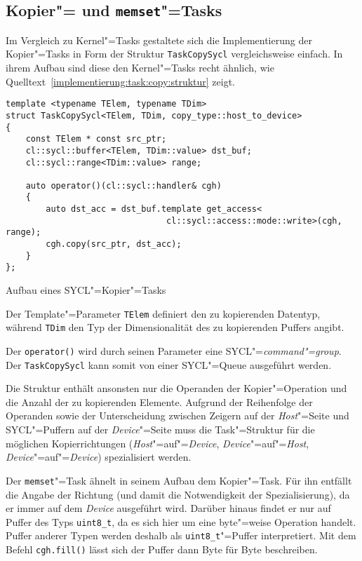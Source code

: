 \subsection{Kopier"= und \texttt{memset}"=Tasks}

Im Vergleich zu Kernel"=Tasks gestaltete sich die Implementierung der
Kopier"=Tasks in Form der Struktur \texttt{TaskCopySycl} vergleichsweise
einfach. In ihrem Aufbau sind diese den Kernel"=Tasks recht ähnlich, wie
Quelltext~\ref{implementierung:task:copy:struktur} zeigt.

\begin{code}
    \begin{verbatim}
template <typename TElem, typename TDim>
struct TaskCopySycl<TElem, TDim, copy_type::host_to_device>
{
    const TElem * const src_ptr;
    cl::sycl::buffer<TElem, TDim::value> dst_buf;
    cl::sycl::range<TDim::value> range;

    auto operator()(cl::sycl::handler& cgh)
    {
        auto dst_acc = dst_buf.template get_access<
                                cl::sycl::access::mode::write>(cgh, range);
        cgh.copy(src_ptr, dst_acc);
    }
};
    \end{verbatim}
    \caption{Aufbau eines SYCL"=Kopier"=Tasks}
    \label{implementierung:task:copy:struktur}
\end{code}
\vspace{3mm}
Der Template"=Parameter \texttt{TElem} definiert den zu kopierenden Datentyp,
während \texttt{TDim} den Typ der Dimensionalität des zu kopierenden Puffers
angibt.  

Der \texttt{operator()} wird durch seinen Parameter eine
SYCL"=\textit{command"=group}. Der \texttt{TaskCopySycl} kann somit von einer
SYCL"=Queue ausgeführt werden.

Die Struktur enthält ansonsten nur die Operanden der Kopier"=Operation und die
Anzahl der zu kopierenden Elemente. Aufgrund der Reihenfolge der Operanden sowie
der Unterscheidung zwischen Zeigern auf der \textit{Host}"=Seite und
SYCL"=Puffern auf der \textit{Device}"=Seite muss die Task"=Struktur für die
möglichen Kopierrichtungen (\textit{Host}"=auf"=\textit{Device},
\textit{Device}"=auf"=\textit{Host}, \textit{Device}"=auf"=\textit{Device})
spezialisiert werden.

Der \texttt{memset}"=Task ähnelt in seinem Aufbau dem Kopier"=Task. Für ihn
entfällt die Angabe der Richtung (und damit die Notwendigkeit der
Spezialisierung), da er immer auf dem \textit{Device} ausgeführt wird. Darüber
hinaus findet er nur auf Puffer des Typs \texttt{uint8\_t}, da es sich hier um
eine byte"=weise Operation handelt. Puffer anderer Typen werden deshalb
als \texttt{uint8\_t}"=Puffer interpretiert. Mit dem Befehl \texttt{cgh.fill()}
lässt sich der Puffer dann Byte für Byte beschreiben.

